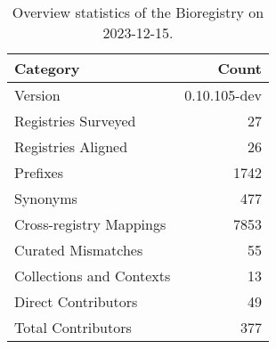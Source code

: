 \begin{table}
\caption{Overview statistics of the Bioregistry on 2023-12-15.}
\label{tab:bioregistry-summary}
\begin{tabular}{lr}
\toprule
Category & Count \\
\midrule
Version & 0.10.105-dev \\
Registries Surveyed & 27 \\
Registries Aligned & 26 \\
Prefixes & 1742 \\
Synonyms & 477 \\
Cross-registry Mappings & 7853 \\
Curated Mismatches & 55 \\
Collections and Contexts & 13 \\
Direct Contributors & 49 \\
Total Contributors & 377 \\
\bottomrule
\end{tabular}
\end{table}
